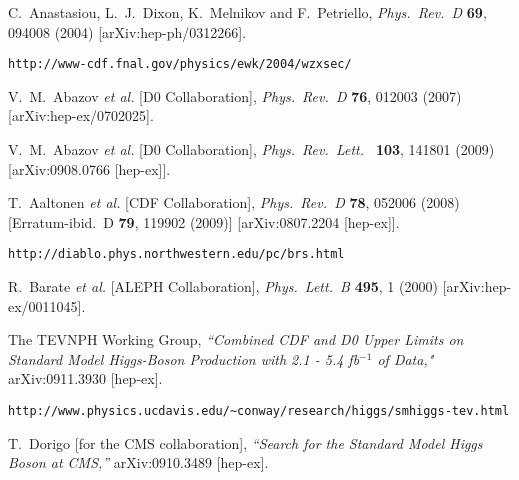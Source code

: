 \documentclass{ws-procs9x6}
\begin{document}
\begin{thebibliography}{99}
  C.~Anastasiou, L.~J.~Dixon, K.~Melnikov and F.~Petriello,
  {\em Phys.\ Rev.\  D} {\bf 69}, 094008 (2004)
  [arXiv:hep-ph/0312266].

{\tt http://www-cdf.fnal.gov/physics/ewk/2004/wzxsec/}

  V.~M.~Abazov {\it et al.}  [D0 Collaboration],
  {\em Phys.\ Rev.\  D} {\bf 76}, 012003 (2007)
  [arXiv:hep-ex/0702025].

  V.~M.~Abazov {\it et al.}  [D0 Collaboration],
  {\em Phys.\ Rev.\ Lett.\ }  {\bf 103}, 141801 (2009)
  [arXiv:0908.0766 [hep-ex]].

  T.~Aaltonen {\it et al.}  [CDF Collaboration],
  {\em Phys.\ Rev.\  D} {\bf 78}, 052006 (2008)
  [Erratum-ibid.\  D {\bf 79}, 119902 (2009)]
  [arXiv:0807.2204 [hep-ex]].
  
{\tt http://diablo.phys.northwestern.edu/pc/brs.html}  
  
  R.~Barate {\it et al.}  [ALEPH Collaboration],
{\em  Phys.\ Lett.\  B} {\bf 495}, 1 (2000)
  [arXiv:hep-ex/0011045].
  
The TEVNPH Working Group,
{\it ``Combined CDF and D0 Upper Limits on Standard Model Higgs-Boson Production
 with 2.1 - 5.4 fb$^{-1}$ of Data,"}
  arXiv:0911.3930 [hep-ex].
  
{\tt http://www.physics.ucdavis.edu/\~{ }conway/research/higgs/smhiggs-tev.html}
  
 T.~Dorigo  [for the CMS collaboration],
{\it ``Search for the Standard Model Higgs Boson at CMS,''}
  arXiv:0910.3489 [hep-ex].
     

\end{thebibliography}
\end{document}
